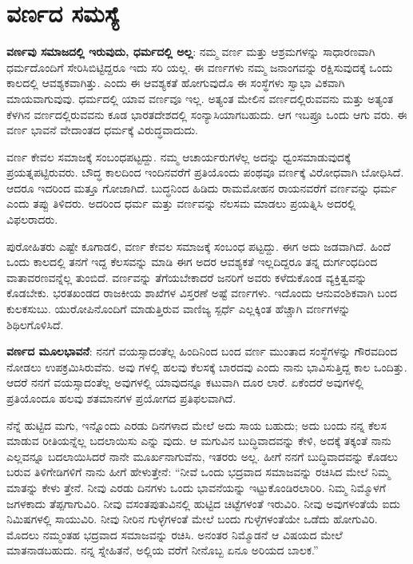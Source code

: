 
\chapter{ವರ್ಣದ ಸಮಸ್ಯೆ}

\textbf{ವರ್ಣವು ಸಮಾಜದಲ್ಲಿ ಇರುವುದು, ಧರ್ಮದಲ್ಲಿ ಅಲ್ಲ}: ನಮ್ಮ ವರ್ಣ ಮತ್ತು ಆಶ್ರಮಗಳನ್ನು ಸಾಧಾರಣವಾಗಿ ಧರ್ಮದೊಂದಿಗೆ ಸೇರಿಸಿಬಿಟ್ಟಿದ್ದರೂ ಇದು ಸರಿ ಯಲ್ಲ. ಈ ವರ್ಣಗಳು ನಮ್ಮ ಜನಾಂಗವನ್ನು ರಕ್ಷಿಸುವುದಕ್ಕೆ ಒಂದು ಕಾಲದಲ್ಲಿ ಆವಶ್ಯಕವಾಗಿತ್ತು. ಎಂದು ಈ ಆವಶ್ಯಕತೆ ಹೋಗುವುದೊ ಈ ಸಂಸ್ಥೆಗಳು ಸ್ವಾಭಾ ವಿಕವಾಗಿ ಮಾಯವಾಗುವುವು. ಧರ್ಮದಲ್ಲಿ ಯಾವ ವರ್ಣವೂ ಇಲ್ಲ. ಅತ್ಯಂತ ಮೇಲಿನ ವರ್ಣದಲ್ಲಿರುವವನು ಮತ್ತು ಅತ್ಯಂತ ಕೆಳಗಿನ ವರ್ಣದಲ್ಲಿರುವವನು ಕೂಡ ಭಾರತದೇಶದಲ್ಲಿ ಸಂನ್ಯಾಸಿಯಾಗಬಹುದು. ಆಗ ಇಬಪ್ರೂ ಒಂದು ಆಗು ವರು. ಈ ವರ್ಣ ಭಾವನೆ ವೇದಾಂತದ ಧರ್ಮಕ್ಕೆ ವಿರುದ್ಧವಾದುದು.

ವರ್ಣ ಕೇವಲ ಸಮಾಜಕ್ಕೆ ಸಂಬಂಧಪಟ್ಟದ್ದು. ನಮ್ಮ ಆಚಾರ್ಯರುಗಳೆಲ್ಲ ಅದನ್ನು ಧ್ವಂಸಮಾಡುವುದಕ್ಕೆ ಪ್ರಯತ್ನಪಟ್ಟಿರುವರು. ಬೌದ್ಧ ಕಾಲದಿಂದ ಇಂದಿನವರೆಗೆ ಪ್ರತಿಯೊಂದು ಪಂಥವೂ ವರ್ಣಕ್ಕೆ ವಿರೋಧವಾಗಿ ಬೋಧಿಸಿದೆ. ಆದರೂ ಇದರಿಂದ ಮತ್ತೂ ಗೋಜಾಗಿದೆ. ಬುದ್ಧನಿಂದ ಹಿಡಿದು ರಾಮಮೋಹನ ರಾಯನವರೆಗೆ ವರ್ಣವನ್ನು ಧರ್ಮ ಎಂದು ತಪ್ಪು ತಿಳಿದರು. ಅದರಿಂದ ಧರ್ಮ ಮತ್ತು ವರ್ಣವನ್ನು ನೆಲಸಮ ಮಾಡಲು ಪ್ರಯತ್ನಿಸಿ ಅದರಲ್ಲಿ ವಿಫಲರಾದರು.

ಪುರೋಹಿತರು ಎಷ್ಟೇ ಕೂಗಾಡಲಿ, ವರ್ಣ ಕೇವಲ ಸಮಾಜಕ್ಕೆ ಸಂಬಂಧ ಪಟ್ಟದ್ದು. ಈಗ ಅದು ಜಡವಾಗಿದೆ. ಹಿಂದೆ ಒಂದು ಕಾಲದಲ್ಲಿ ತನಗೆ ಇದ್ದ ಕೆಲಸವನ್ನು ಮಾಡಿ ಈಗ ಅದರ ಆವಶ್ಯಕತೆ ಇಲ್ಲದಿದ್ದರೂ ತನ್ನ ದುರ್ಗಂಧದಿಂದ ವಾತಾವರಣವನ್ನೆಲ್ಲ ತುಂಬಿದೆ. ವರ್ಣವನ್ನು ತೆಗೆಯಬೇಕಾದರೆ ಜನರಿಗೆ ಅವರು ಕಳೆದುಕೊಂಡ ವ್ಯಕ್ತಿತ್ವವನ್ನು ಕೊಡಬೇಕು. ಭರತಖಂಡದ ರಾಜಕೀಯ ಶಾಖೆಗಳ ವಿಸ್ತರಣೆ ಅಷ್ಟೆ ವರ್ಣಗಳು. ಇದೊಂದು ಆನುವಂಶಿಕವಾಗಿ ಬಂದ ಕುಲಕಸುಬು. ಯುರೋಪಿನೊಂದಿಗೆ ಮಾಡುತ್ತಿರುವ ವಾಣಿಜ್ಯ ಸ್ಪರ್ಧೆ ಎಲ್ಲಕ್ಕಿಂತ ಹೆಚ್ಚಾಗಿ ವರ್ಣಗಳನ್ನು ಶಿಥಿಲಗೊಳಿಸಿದೆ.

\textbf{ವರ್ಣದ ಮೂಲಭಾವನೆ}: ನನಗೆ ವಯಸ್ಸಾದಂತೆಲ್ಲ ಹಿಂದಿನಿಂದ ಬಂದ ವರ್ಣ ಮುಂತಾದ ಸಂಸ್ಥೆಗಳನ್ನು ಗೌರವದಿಂದ ನೋಡಲು ಉಪಕ್ರಮಿಸಿರುವೆನು. ಅವು ಗಳಲ್ಲಿ ಹಲವು ಕೆಲಸಕ್ಕೆ ಬಾರದವು ಎಂದು ನಾನು ಭಾವಿಸುತ್ತಿದ್ದ ಕಾಲ ಒಂದಿತ್ತು. ಆದರೆ ನನಗೆ ವಯಸ್ಸಾದಂತೆಲ್ಲ ಅವುಗಳಲ್ಲಿ ಯಾವುದನ್ನೂ ಕಟುವಾಗಿ ದೂರ ಲಾರೆ. ಏಕೆಂದರೆ ಅವುಗಳಲ್ಲಿ ಪ್ರತಿಯೊಂದೂ ಹಲವು ಶತಮಾನಗಳ ಪ್ರಯೋಗದ ಪ್ರತಿಫಲವಾಗಿದೆ.

ನೆನ್ನೆ ಹುಟ್ಟಿದ ಮಗು, ಇನ್ನೊಂದು ಎರಡು ದಿನಗಳಾದ ಮೇಲೆ ಅದು ಸಾಯ ಬಹುದು; ಅದು ಬಂದು ನನ್ನ ಕೆಲಸ ಮಾಡುವ ರೀತಿಯನ್ನೆಲ್ಲ ಬದಲಾಯಿಸು ಎನ್ನು ವುದು. ಆ ಮಗುವಿನ ಬುದ್ಧಿವಾದವನ್ನು ಕೇಳಿ, ಅದಕ್ಕೆ ತಕ್ಕಂತೆ ನಾನು ಎಲ್ಲವನ್ನೂ ಬದಲಾಯಿಸಿದರೆ ನಾನೇ ಮೂರ್ಖನಾಗುವೆನು, ಇತರರು ಅಲ್ಲ. ಹೀಗೆ ನನಗೆ ಬುದ್ಧಿವಾದವನ್ನು ಕೊಡಲು ಬರುವ ತಿಳಿಗೇಡಿಗಳಿಗೆ ನಾನು ಹೀಗೆ ಹೇಳುತ್ತೇನೆ: “ನೀವೆ ಒಂದು ಭದ್ರವಾದ ಸಮಾಜವನ್ನು ರಚಿಸಿದ ಮೇಲೆ ನಿಮ್ಮ ಮಾತನ್ನು ಕೇಳು ತ್ತೇನೆ. ನೀವು ಎರಡು ದಿನಗಳು ಒಂದು ಭಾವನೆಯನ್ನು ಇಟ್ಟುಕೊಂಡಿರಲಾರಿರಿ. ನಿಮ್ಮ ನಿಮ್ಮೊಳಗೆ ಜಗಳಕಾದು ತೆಪ್ಪಗಾಗುವಿರಿ. ನೀವು ವಸಂತಪುತುವಿನಲ್ಲಿ ಹುಟ್ಟಿದ ಚಿಟ್ಟೆಗಳಂತೆ ಇರುವಿರಿ. ನೀವು ಅವುಗಳಂತೆಯೆ ಐದು ನಿಮಿಷಗಳಲ್ಲಿ ಸಾಯುವಿರಿ. ನೀವು ನೀರಿನ ಗುಳ್ಳೆಗಳಂತೆ ಮೇಲೆ ಬಂದು ಗುಳ್ಳೆಗಳಂತೆಯೇ ಒಡೆದು ಹೋಗುವಿರಿ. ಮೊದಲು ನಮ್ಮಂತಹ ಭದ್ರವಾದ ಸಮಾಜವನ್ನು ರಚಿಸಿ. ಅನಂತರ ನಿಮ್ಮೊಡನೆ ಆ ವಿಷಯದ ಮೇಲೆ ಮಾತನಾಡಬಹುದು. ನನ್ನ ಸ್ನೇಹಿತನೆ, ಅಲ್ಲಿಯ ವರೆಗೆ ನೀನೊಬ್ಬ ಏನೂ ಅರಿಯದ ಬಾಲಕ.”


